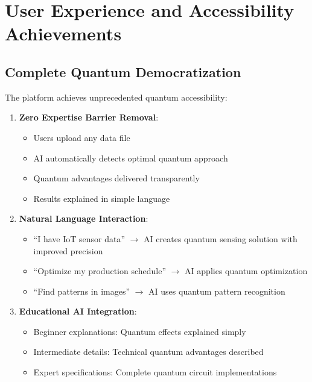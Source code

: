 \documentclass[12pt,a4paper]{article}
\begin{document}
\section{User Experience and Accessibility Achievements}

\subsection{Complete Quantum Democratization}

The platform achieves unprecedented quantum accessibility:

\begin{enumerate}
    \item \textbf{Zero Expertise Barrier Removal}:
    \begin{itemize}
        \item Users upload any data file
        \item AI automatically detects optimal quantum approach
        \item Quantum advantages delivered transparently
        \item Results explained in simple language
    \end{itemize}
    
    \item \textbf{Natural Language Interaction}:
    \begin{itemize}
        \item         ``I have IoT sensor data'' $\rightarrow$ AI creates quantum sensing solution with improved precision
        \item ``Optimize my production schedule'' $\rightarrow$ AI applies quantum optimization
        \item ``Find patterns in images'' $\rightarrow$ AI uses quantum pattern recognition
    \end{itemize}
    
    \item \textbf{Educational AI Integration}:
    \begin{itemize}
        \item Beginner explanations: Quantum effects explained simply
        \item Intermediate details: Technical quantum advantages described
        \item Expert specifications: Complete quantum circuit implementations
    \end{itemize}
\end{enumerate}
\end{document}
